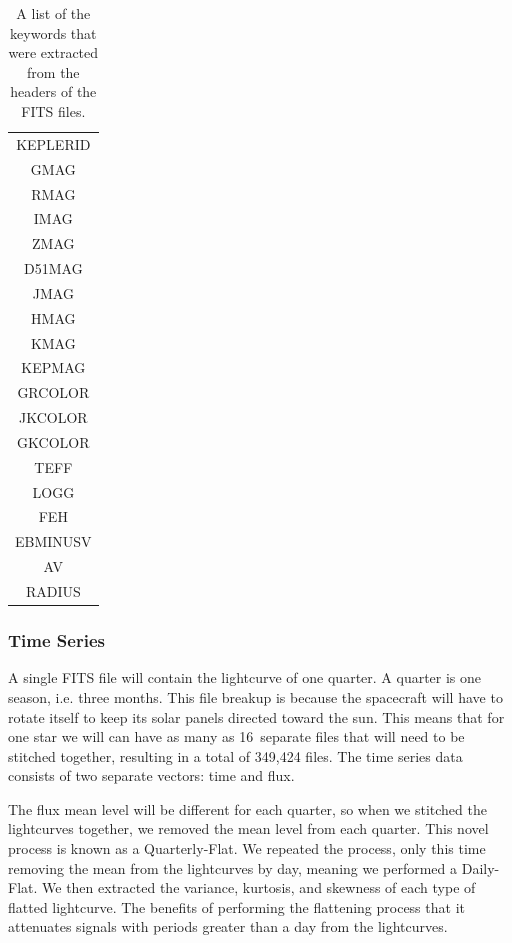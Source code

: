 \documentclass[12pt]{article}
\begin{document}
\begin{table}
    \begin{center}
    \begin{tabular}{|c|}
        \hline
        KEPLERID\\
        GMAG\\
        RMAG\\
        IMAG\\
        ZMAG\\
        D51MAG\\
        JMAG\\
        HMAG\\
        KMAG\\
        KEPMAG\\
        GRCOLOR\\
        JKCOLOR\\
        GKCOLOR\\
        TEFF\\
        LOGG\\
        FEH\\
        EBMINUSV\\
        AV\\
        RADIUS\\
        \hline
    \end{tabular}
    \end{center}
    \caption{A list of the keywords that were extracted from the headers of the FITS files.}
    \label{tab:keywords}
\end{table}

\subsubsection{Time Series}
\label{ssub:Time Series}

A single FITS file will contain the lightcurve of one quarter.
A quarter is one season, i.e. three months.
This file breakup is because the spacecraft will have to rotate itself to keep its solar panels directed toward the sun.
This means that for one star we will can have as many as 16~separate files that will need to be stitched together, resulting in a total of 349,424 files.
The time series data consists of two separate vectors: time and flux.

The flux mean level will be different for each quarter, so when we stitched the lightcurves together, we removed the mean level from each quarter.
This novel process is known as a Quarterly-Flat.
We repeated the process, only this time removing the mean from the lightcurves by day, meaning we performed a Daily-Flat.
We then extracted the variance, kurtosis, and  skewness of each type of flatted lightcurve.
The benefits of performing the flattening process that it attenuates signals with periods greater than a day from the lightcurves.
\end{document}
